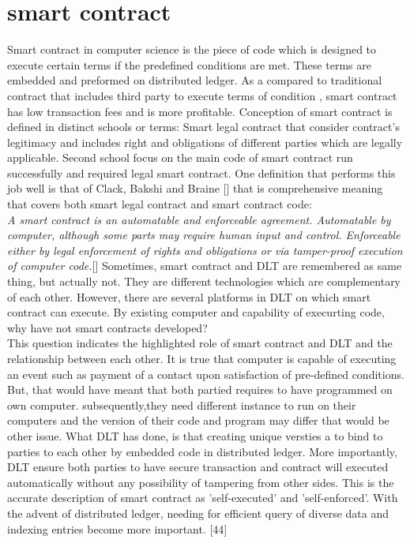 \section{smart contract}
Smart contract in computer science is the piece of code which is designed to execute certain terms if the predefined conditions are met. These terms are embedded and preformed on distributed ledger. As a compared to traditional contract that includes third party to execute terms of condition , smart contract has low transaction fees and is more profitable. Conception of smart contract is defined in distinct schools or terms: Smart legal contract that consider contract's legitimacy and includes right and obligations of different parties which are legally applicable. Second school focus on the main code of smart contract run successfully and required legal smart contract. One definition that performs this job well is that of Clack, Bakshi and Braine [] that is comprehensive meaning that covers both smart legal contract and smart contract code:\\
\textit{A smart contract is an automatable and enforceable agreement. Automatable by computer, although some parts may require human input and control. Enforceable either by legal enforcement of rights and obligations or via tamper-proof execution of computer code.}[]
Sometimes, smart contract and DLT are remembered as same thing, but actually not. They are different technologies which are complementary of each other. However, there are several platforms in DLT on which smart contract can execute. By existing computer and capability of execurting code, why have not smart contracts developed?\\
This question indicates the highlighted role of smart contract and DLT and the relationship between each other.
It is true that computer is capable of executing an event such as payment of a contact upon satisfaction of pre-defined conditions. But, that would have meant that both partied requires to have programmed on own computer. subsequently,they need different instance to run on their computers and the version of their code and program may differ that would be other issue. 
What DLT has done, is that creating unique versties a to bind to parties to each other by embedded code in distributed ledger. More importantly, DLT ensure both parties to have secure transaction and contract will executed automatically without any possibility of tampering from other sides. This is the accurate description of smart contract as 'self-executed' and 'self-enforced'. 
With the advent of distributed ledger, needing for efficient query of diverse data  and indexing entries become more important.  [44]   \\
